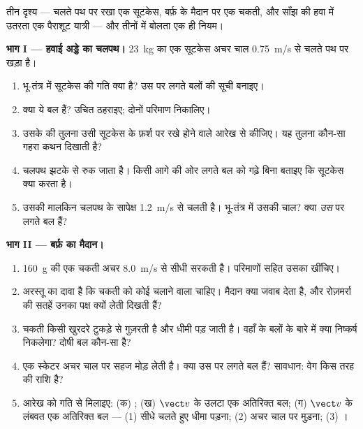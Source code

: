 \begin{problem}
\label{pb:g10:inertia:1}
तीन दृश्य --- चलते पथ पर रखा एक सूटकेस, बर्फ़ के मैदान पर एक चकती, और
साँझ की हवा में उतरता एक पैराशूट यात्री --- और तीनों में बोलता एक ही
नियम।

\medskip
\noindent\textbf{भाग I --- हवाई अड्डे का चलपथ।}
\qty{23}{kg} का एक सूटकेस अचर चाल \qty{0.75}{m/s} से चलते पथ पर खड़ा है।
\begin{enumerate}
  \item भू-तंत्र में सूटकेस की गति क्या है? उस पर लगते बलों की
        सूची बनाइए।
  \item क्या ये बल  हैं? उचित ठहराइए; दोनों
        परिमाण निकालिए।
  \item उसके  की तुलना उसी सूटकेस के फ़र्श पर रखे होने
        वाले आरेख से कीजिए। यह तुलना कौन-सा गहरा कथन दिखाती है?
  \item चलपथ झटके से रुक जाता है। किसी आगे की ओर लगते बल को
        गढ़े बिना बताइए कि सूटकेस क्या करता है।
  \item उसकी मालकिन चलपथ के सापेक्ष \qty{1.2}{m/s} से चलती है। भू-तंत्र में
        उसकी चाल? क्या \emph{उस} पर लगते बल
         हैं?
\end{enumerate}

\medskip
\noindent\textbf{भाग II --- बर्फ़ का मैदान।}
\begin{enumerate}[resume]
  \item \qty{160}{g} की एक चकती अचर \qty{8.0}{m/s} से सीधी सरकती है। परिमाणों सहित
        उसका  खींचिए।
  \item अरस्तू का दावा है कि चकती को कोई चलाने वाला चाहिए। मैदान क्या
        जवाब देता है, और रोज़मर्रा की सतहें उनका पक्ष क्यों लेती दिखती
        हैं?
  \item चकती किसी खुरदरे टुकड़े से गुज़रती है और धीमी पड़ जाती है। वहाँ
        के बलों के बारे में क्या निष्कर्ष निकलेगा? दोषी
        बल कौन-सा है?
  \item एक स्केटर अचर चाल पर सहज मोड़ लेती है। क्या उस पर लगते
        बल  हैं? सावधान: वेग किस तरह की राशि
        है?
  \item आरेख को गति से मिलाइए: (क) ; (ख) $\vect v$
        के उलटा एक अतिरिक्त बल; (ग) $\vect v$ के लंबवत एक
        अतिरिक्त बल --- (1) सीधे चलते हुए धीमा पड़ना; (2) अचर
        चाल पर मुड़ना; (3) ।
\end{enumerate}


\end{problem}
